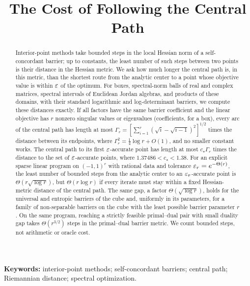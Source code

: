 \documentclass[11pt]{article}
\title{The Cost of Following the Central Path}
\author{}
\date{}
\begin{document}
\maketitle
\begin{abstract}
Interior-point methods take bounded steps in the local Hessian norm of
a self-concordant barrier; up to constants, the least number of such
steps between two points is their distance in the Hessian metric.
We ask how much longer the central path is, in this metric, than the
shortest route from the analytic center to a point whose objective value
is within $\varepsilon$ of the optimum. For boxes, spectral-norm balls of real
and complex matrices, spectral intervals of Euclidean Jordan
algebras, and products of these domains, with their standard logarithmic and log-determinant barriers,
we compute these distances exactly. If all factors have the same
barrier coefficient and the linear objective has $r$ nonzero singular
values or eigenvalues (coefficients, for a box), every arc of the central
path has length at most
$\Gamma_r=[\sum_{i=1}^r(\sqrt i-\sqrt{i-1})^2]^{1/2}$
times the distance between its endpoints, where
$\Gamma_r^2=\frac14\log r+O(1)$, and no smaller constant works. The
central path to its first $\varepsilon$-accurate point has length at most
$c_\star\Gamma_r$ times the distance to the set of $\varepsilon$-accurate
points, where $1.37486<c_\star<1.38$.
For an explicit sparse linear program on $(-1,1)^r$ with
rational data and tolerance $\varepsilon_r=e^{-\Theta(r)}$, the least number of bounded steps
from the analytic center to an $\varepsilon_r$-accurate point is
$\Theta(r\sqrt{\log r})$, but $\Theta(r\log r)$ if every iterate must
stay within a fixed Hessian-metric distance of the central path. The
same gap, a factor $\Theta(\sqrt{\log r})$, holds for the universal and
entropic barriers of the cube and, uniformly in its parameters, for a
family of non-separable barriers on the cube with the least possible
barrier parameter $r$. On the same program, reaching a strictly feasible
primal--dual pair with small duality gap takes $\Theta(r^{3/2})$ steps
in the primal--dual barrier metric. We count bounded steps, not
arithmetic or oracle cost.
\end{abstract}
\noindent\textbf{Keywords:} interior-point methods; self-concordant barriers;
central path; Riemannian distance; spectral optimization.
\tableofcontents











\appendix





\end{document}
